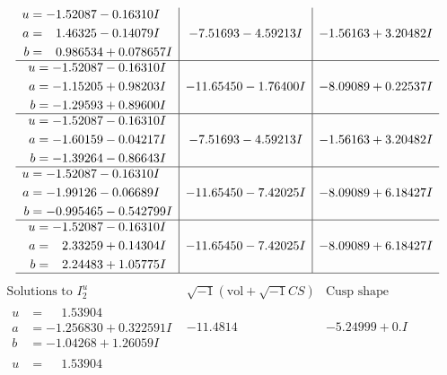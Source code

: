\documentclass[1p]{elsarticle_modified}
\theoremstyle{definition}
\newcommand{\I}{\sqrt{-1}}
\begin{document}
$$\begin{array}{c|c|c}
\begin{aligned}
u &= -1.52087 - 0.16310 I \\
a &= \phantom{-}1.46325 - 0.14079 I \\
b &= \phantom{-}0.986534 + 0.078657 I\end{aligned}
 & -7.51693 - 4.59213 I & -1.56163 + 3.20482 I \\ \hline\begin{aligned}
u &= -1.52087 - 0.16310 I \\
a &= -1.15205 + 0.98203 I \\
b &= -1.29593 + 0.89600 I\end{aligned}
 & -11.65450 - 1.76400 I & -8.09089 + 0.22537 I \\ \hline\begin{aligned}
u &= -1.52087 - 0.16310 I \\
a &= -1.60159 - 0.04217 I \\
b &= -1.39264 - 0.86643 I\end{aligned}
 & -7.51693 - 4.59213 I & -1.56163 + 3.20482 I \\ \hline\begin{aligned}
u &= -1.52087 - 0.16310 I \\
a &= -1.99126 - 0.06689 I \\
b &= -0.995465 - 0.542799 I\end{aligned}
 & -11.65450 - 7.42025 I & -8.09089 + 6.18427 I \\ \hline\begin{aligned}
u &= -1.52087 - 0.16310 I \\
a &= \phantom{-}2.33259 + 0.14304 I \\
b &= \phantom{-}2.24483 + 1.05775 I\end{aligned}
 & -11.65450 - 7.42025 I & -8.09089 + 6.18427 I\\
 \hline 
 \end{array}$$\newpage$$\begin{array}{c|c|c}  
\text{Solutions to }I^u_{2}& \I (\text{vol} + \sqrt{-1}CS) & \text{Cusp shape}\\
 \hline 
\begin{aligned}
u &= \phantom{-}1.53904\phantom{ +0.000000I} \\
a &= -1.256830 + 0.322591 I \\
b &= -1.04268 + 1.26059 I\end{aligned}
 & -11.4814\phantom{ +0.000000I} & -5.24999 + 0. I\phantom{ +0.000000I} \\ \hline\begin{aligned}
u &= \phantom{-}1.53904\phantom{ +0.000000I} \\

\end{aligned}
\end{array}$$
\end{document}
